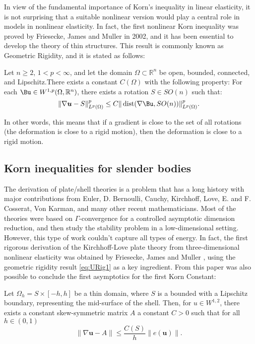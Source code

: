 In view of the fundamental importance of Korn’s inequality in linear elasticity, it is not
surprising that a suitable nonlinear version would play a central role in models in nonlinear elasticity. In fact, the first nonlinear Korn inequality was proved by Friesecke, James and Muller \cite{bib:Fri.Jam.Mue.1} in 2002, and it has been essential to develop the theory of thin structures. This result is commonly known as Geometric Rigidity, and it is stated as follows:
\begin{theorem}
    \label{uniformRigidityGeneral}
    Let $n \geq 2$, $1<p<\infty$, and let the domain $\Omega \subset \mathbb{R}^n$ be open, bounded, connected, and Lipschitz.There exists a constant $C(\Omega)$ with the following property: For each $\Bu\in W^{1,p}(\Omega,\R^n)$, there exists a rotation $S\in SO(n)$ such that:
    \begin{equation}
       \label{eq:URig1}
       \|\nabla \boldsymbol{u}-S\|_{L^p(\Omega)}^p \leq C\|\operatorname{dist}(\nabla \Bu, SO(n))\|_{L^p(\Omega)}^p .
    \end{equation}
\end{theorem}
In other words, this means that if a gradient is close to the set of all rotations (the deformation is close to a rigid motion), then the deformation is close to a rigid motion. 

\subsection{Korn inequalities for slender bodies}
\label{sec:plate}
The derivation of plate/shell theories is a problem that has a long history with major contributions from Euler, D. Bernoulli, Cauchy, Kirchhoff, Love, E. and F. Cosserat, Von Karman, and many other recent mathematicians. Most of the theories were based on $\Gamma$-convergence for a controlled asymptotic dimension reduction, and then study the stability problem in a low-dimensional setting. However, this type of work couldn’t capture all types of energy. 
In fact, the first rigorous derivation of the Kirchhoff-Love plate theory from three-dimensional nonlinear elasticity was obtained by Friesecke, James and Muller \cite{bib:Fri.Jam.Mue.1}, using the geometric rigidity result \ref{eq:URig1} as a key ingredient. From this paper was also possible to conclude the first asymptotics for the first Korn Constant:

\begin{theorem}
    \label{kornPlate}
    Let $\Omega_h= S\times [-h,h]$ be a thin domain, where $S$ is a bounded with a Lipschitz boundary, representing the mid-surface of the shell. Then, for $u\in W^{1,2}$, there exists a constant skew-symmetric matrix $A$ a constant $C>0$ such that for all $h \in(0,1)$
    \begin{equation}
        \label{eq:KornPlate}
        \|\nabla \boldsymbol{u}-A\|\leq \frac{C(S)}{h}\|e(\boldsymbol{u})\|.
    \end{equation}
\end{theorem}

